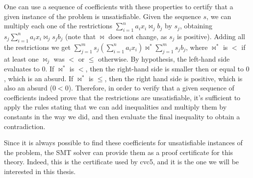 One can use a sequence of coefficients with these properties to certify that a given instance of the problem is unsatisfiable. Given the sequence $s$, we can multiply each one of the restrictions $\sum_{i = 1}^{n} a_{i} x_{i} \bowtie_{j} b_{j}$ by $s_{j}$, obtaining $ s_{j} \sum_{i = 1}^{n} a_{i} x_{i} \bowtie_{j} s_{j} b_{j}$ (note that $\bowtie$ does not change, as $s_{j}$ is positive). Adding all the restrictions we get $\sum_{j = 1}^{m} s_{j} (\sum_{i = 1}^{n} a_{i} x_{i}) \bowtie^{*} \sum_{j = 1}^{m} s_{j} b_{j}$, where $\bowtie^{*}$ is $<$ if at least one $\bowtie_{j}$ was $<$ or $\le$ otherwise. By hypothesis, the left-hand side evaluates to $0$. If $\bowtie^{*}$ is $<$, then the right-hand side is smaller then or equal to $0$, which is an absurd. If $\bowtie^{*}$ is $\le$, then the right hand side is positive, which is also an absurd ($0 < 0$). Therefore, in order to verify that a given sequence of coefficients indeed prove that the restrictions are unsatisfiable, it's sufficient to apply the rules stating that we can add inequalities and multiply them by constants in the way we did, and then evaluate the final inequality to obtain a contradiction.

Since it is always possible to find these coefficients for unsatisfiable instances of the problem, the SMT solver can provide them as a proof certificate for this theory. Indeed, this is the certificate used by cvc5, and it is the one we will be interested in this thesis.






